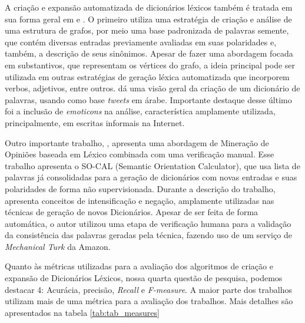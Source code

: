 \documentclass[12pt]{article}
\begin{document}
A criação e expansão automatizada de dicionários léxicos também é tratada em sua forma geral em \cite{widdows2002graph} e \cite{duwairi2015detecting}. O primeiro utiliza uma estratégia de criação e análise de uma estrutura de grafos, por meio uma base padronizada de palavras semente, que contém diversas entradas previamente avaliadas em suas polaridades e, também, a descrição de seus sinônimos. Apesar de fazer uma abordagem focada em substantivos, que representam os vértices do grafo, a ideia principal pode ser utilizada em outras estratégias de geração léxica automatizada que incorporem verbos, adjetivos, entre outros. \cite{duwairi2015detecting} dá uma visão geral da criação de um dicionário de palavras, usando como base \emph{tweets} em árabe. Importante destaque desse último foi a inclusão de \emph{emoticons} na análise, característica amplamente utilizada, principalmente, em escritas informais na Internet.

Outro importante trabalho, \cite{taboada2011lexicon}, apresenta uma abordagem de Mineração de Opiniões baseada em Léxico combinada com uma verificação manual. Esse trabalho apresenta o SO-CAL (Semantic Orientation Calculator), que usa lista de palavras já consolidadas para a geração de dicionários com novas entradas e suas polaridades de forma não supervisionada. Durante a descrição do trabalho, apresenta conceitos de intensificação e negação, amplamente utilizadas nas técnicas de geração de novos Dicionários. Apesar de ser feita de forma automática, o autor utilizou uma etapa de verificação humana para a validação da consistência das palavras geradas pela técnica, fazendo uso de um serviço de\emph{ Mechanical Turk} da Amazon. 

Quanto às métricas utilizadas para a avaliação dos algoritmos de criação e expansão de Dicionários Léxicos, nossa quarta questão de pesquisa, podemos destacar 4: Acurácia, precisão, \emph{Recall} e \emph{F-measure}. A maior parte dos trabalhos utilizam mais de uma métrica para a avaliação dos trabalhos. Mais detalhes são apresentados na tabela \ref{tab:tab_measures}
\end{document}
